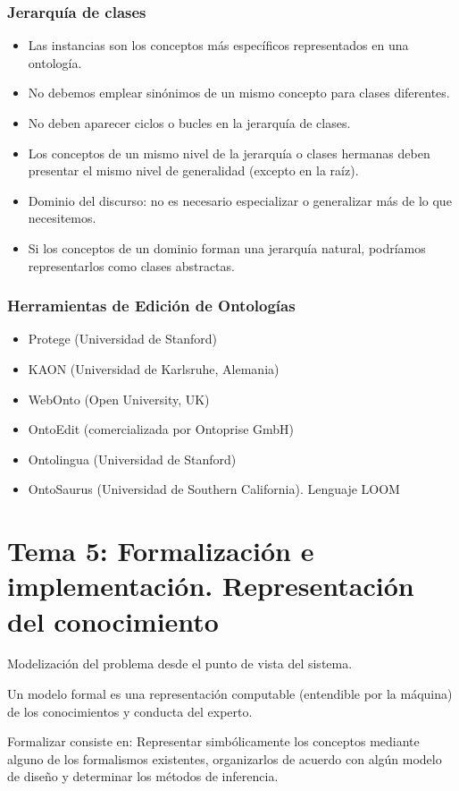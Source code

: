 \documentclass[12pt, twoside, openright]{report} %
\begin{document}
\subsection{Jerarquía de clases}
\begin{itemize}
	\item Las instancias son los conceptos más específicos representados en una ontología.
	\item No debemos emplear sinónimos de un mismo concepto para clases diferentes.
	\item No deben aparecer ciclos o bucles en la jerarquía de clases.
	\item Los conceptos de un mismo nivel de la jerarquía o clases hermanas deben presentar el mismo nivel de generalidad (excepto en la raíz).
	\item Dominio del discurso: no es necesario especializar o generalizar más de lo que necesitemos.
	\item Si los conceptos de un dominio forman una jerarquía natural, podríamos representarlos como clases abstractas.
\end{itemize}

\subsection{Herramientas de Edición de Ontologías}
\begin{itemize}
	\item Protege (Universidad de Stanford)
	\item KAON (Universidad de Karlsruhe, Alemania)
	\item WebOnto (Open University, UK)
	\item OntoEdit (comercializada por Ontoprise GmbH)
	\item Ontolingua (Universidad de Stanford)
	\item OntoSaurus (Universidad de Southern California). Lenguaje LOOM
\end{itemize}

\chapter{Tema 5: Formalización e implementación. Representación del conocimiento}
Modelización del problema desde el punto de vista del sistema.

Un modelo formal es una representación computable (entendible por la máquina) de los conocimientos y conducta del experto.

Formalizar consiste en: Representar simbólicamente los conceptos mediante alguno de los formalismos existentes, organizarlos de acuerdo con algún modelo de diseño y determinar los métodos de inferencia.
\end{document}
